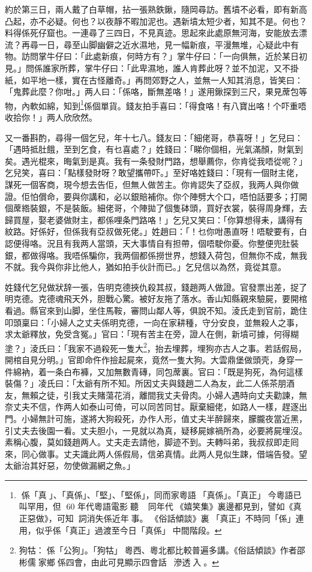 \documentclass[a5paper, 12pt, openany]{book} %
\begin{document}
	約於第三日，兩人戴了白草帽，拈一張熟鉄鍬，隨岡尋訪。舊墳不必看，即有新高凸起，亦不必疑。何也？以夜靜不暇加泥也。遇新墳太短少者，知其不是。何也？料得係死仔窟也。一連尋了三四日，不見真迹。思起來此處原無河海，安能放去漂流？再尋一日，尋至山脚幽僻之近水濕地，見一幅新痕，平漫無堆，心疑此中有物。訪問掌牛仔曰：「此處新痕，何時方有？」掌牛仔曰：「一向俱無，近於某日初見。」問係誰家所葬，掌牛仔曰：「此卑濕地，誰人肯葬此呀？並不加泥，又不掛紙，如平地一樣，實在古怪離奇。」再問郊野之人，並無一人知其消息，皆笑曰：「鬼葬此麼？你咁。」两人曰：「係咯，斷無差咯！」遂用鍬探到三尺，果見蓆包等物，內軟如綿，知到\footnote{
  係「真󱝚」、「真係」、「堅」、「堅係」，同而家粵語󱝚「真係」。「真正」󱪙今粵語已叫罕用，但󱪙 60 年代粵語電影󱄵聽󰧱，󱪙同年代󱝚《嬉笑集》裏邊都見到，譬如《真正惡做》，可知󰳞詞消失係近年󱝚事。󱪙《俗話傾談》裏󰊺「真正」不時同「係」連用，似乎係「真正」過渡至今日「真係」󱝚中間階段。
}係個單貨。錢友拍手喜曰：「得食咯！有八寶出咯！个吓重唔收拾你！」两人欣欣然。

	又一番斟酌，尋得一個乞兒，年十七八。錢友曰：「細佬哥，恭喜呀！」乞兒曰：「遇時抵肚餓，至到乞食，有乜喜處？」姓錢曰：「睇你個相，光氣滿顏，財氣到矣。遇光棍來，晦氣到是真。我有一条發財門路，想舉薦你，你肯從我唔從呢？」乞兒笑，喜曰：「點樣發財呀？敢望攜帶吓。」至好咯姓錢曰：「現有一個財主佬，謀死一個客商，現今想去告佢，但無人做苦主。你肯認失了亞叔，我两人與你做證。佢怕償命，要與你講和，必以銀賠補你。你个陣劈大个口，唔怕話要多；打開個蓆綹裝銀，不是裝飯。細佬哥，个陣拋了個隻砵頭，買好衣裳，裝得周身輝，去歸買屋，娶老婆做財主，都係哩条門路咯！」乞兒又笑曰：「你算想得耒，講得有紋路。好係好，但係我有亞叔做死佬。」姓趙曰：「！乜你咁愚直呀！唔駛要有，白認便得咯。況且有我两人當頭，天大事情自有担帶，個唔駛你憂。你整便兜肚裝銀，都做得咯。我唔係騙你，我两個都係撈世界，想錢入荷包，但無你不成，無我不就。我今與你非比他人，猶如拍手伙計而已。」乞兒信以為然，竟從其意。

	姓錢代乞兒做狀辞一張，告明克德挾仇殺其叔，錢趙两人做證。官發票出差，捉了明克德。克德魂飛天外，胆戰心驚。被好友拖了落水。香山知縣親來驗屍，要開棺看過。縣官來到山脚，坐住馬鞍，審問山鄰人等，俱說不知。淩氏走到官前，跪住叩頭稟曰：「小婦人之丈夫係明克德，一向在家耕種，守分安良，並無殺人之事，求太爺釋放，免受含冤。」官曰：「現有苦主在旁，證人在側，新墳可據，何得糊塗？」淩氏曰：「我家不過殺死一隻大\footnote{狗牯：係「公狗」。「狗牯」󱪙粵西、粵北都比較普遍多講。《俗話傾談》作者邵彬儒󱝚家鄉係四會，由此可見顯示四會話󱪙滲透󱃡入。}，抬去埋葬，埋狗亦古人之事。若話假局，開棺自見分明。」官即命仵作撿起屍來，竟然一隻大狗。大雲鼎堡做頭壳，身穿一件綿衲，着一条白布褲，又加無數青磚，同包蓆裏。官曰：「既是狗死，為何這樣裝傷？」凌氏曰：「太爺有所不知。所因丈夫與錢趙二人為友，此二人係茶朋酒友，無賴之徒，引我丈夫賭蕩花消，離間我丈夫骨肉。小婦人遇時向丈夫勸諫，無奈丈夫不信，作两人如泰山可倚，可以同苦同甘。厭棄細佬，如路人一樣，趕逐出門。小婦無計可施，遂將大狗殺死，办作人形，值丈夫半醉歸來，朦朧夜當近黑，引丈夫去後園一看。丈夫胆小，一見就以為真，疑移屍嫁禍所為，必要將屍埋沒。素稱心腹，莫如錢趙两人。丈夫走去請他，脚迹不到。夫轉呌弟，我叔叔即走囘來，同心做事。丈夫識此两人係假局，信弟真情。此两人見似生踈，借端告發。望太爺治其好惡，勿使做漏網之魚。」
\end{document}
